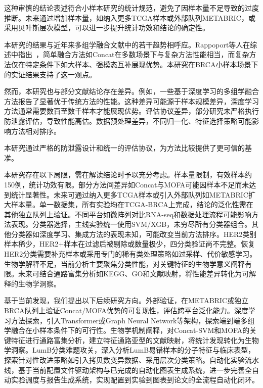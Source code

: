 这种审慎的结论表述符合小样本研究的统计规范，避免了因样本量不足导致的过度推断。未来通过增加样本量，如纳入更多TCGA样本或外部队列METABRIC，或采用贝叶斯层次模型，可以进一步提升统计功效和结论的确定性。

本研究的结果与近年来多组学融合文献中的若干趋势相呼应。Rappoport等人在综述中指出~\cite{rappoport2018}，简单融合方法如Concat在多数场景下与复杂方法性能相当，而复杂方法仅在特定条件下如大样本、强模态互补展现优势。本研究在BRCA小样本场景下的实证结果支持了这一观点。

然而，本研究也与部分文献结论存在差异。例如，一些基于深度学习的多组学融合方法报告了显著优于传统方法的性能。这种差异可能源于样本规模差异，深度学习方法通常需要数百至数千样本才能展现优势。评估协议差异，部分研究未严格执行防泄露评估，导致性能高估。数据预处理差异，不同归一化、特征选择策略可能影响方法相对排序。

本研究通过严格的防泄露设计和统一的评估协议，为方法比较提供了更可信的基准。

本研究存在以下局限，需在解读结论时予以充分考虑。样本量限制，有效样本约150例，统计功效有限。部分方法间差异如Concat与MOFA可能因样本不足而未达到统计显著性。未来可通过纳入更多TCGA样本或引入外部队列如METABRIC扩大样本量。单一数据集，所有实验均在TCGA-BRCA上完成，结论的泛化性需在其他独立队列上验证。不同平台如微阵列对比RNA-seq和数据处理流程可能影响方法表现。分类器选择，主线实验统一使用SVM/XGB，未穷尽所有分类器组合。其他分类器如深度学习、集成方法的表现未知，可能改变当前方法排序。HER2类别样本稀少，HER2+样本在过滤后被剔除或数量极少，四分类验证尚不完整。恢复HER2分类需要补充样本或采用专门的稀有类处理策略如过采样、代价敏感学习。生物学解释不足，当前分析主要聚焦分类性能，对关键特征的生物学意义阐释有限。未来可结合通路富集分析如KEGG、GO和文献映射，将性能差异转化为可解释的生物学洞察。

基于当前发现，我们提出以下后续研究方向。外部验证，在METABRIC或独立BRCA队列上验证Concat/MOFA优势的可复现性，评估跨平台泛化能力。深度学习方法探索，引入Transformer或Graph Neural Network等架构，探索端到端多组学融合在小样本条件下的可行性。生物学机制阐释，对Concat-SVM和MOFA的关键特征进行通路富集分析，建立特征通路亚型的文献映射，将统计发现转化为生物学洞察。LumB分类难题攻关，深入分析LumB易错样本的分子特征与临床表型，探索针对性改进策略如引入拷贝数变异数据、采用层次分类策略。自动化实验流水线，基于当前配置文件驱动架构与已完成的自动化图表生成系统，进一步完善全自动实验调度与报告生成系统，实现配置到实验到图表到论文的全流程自动化闭环。

